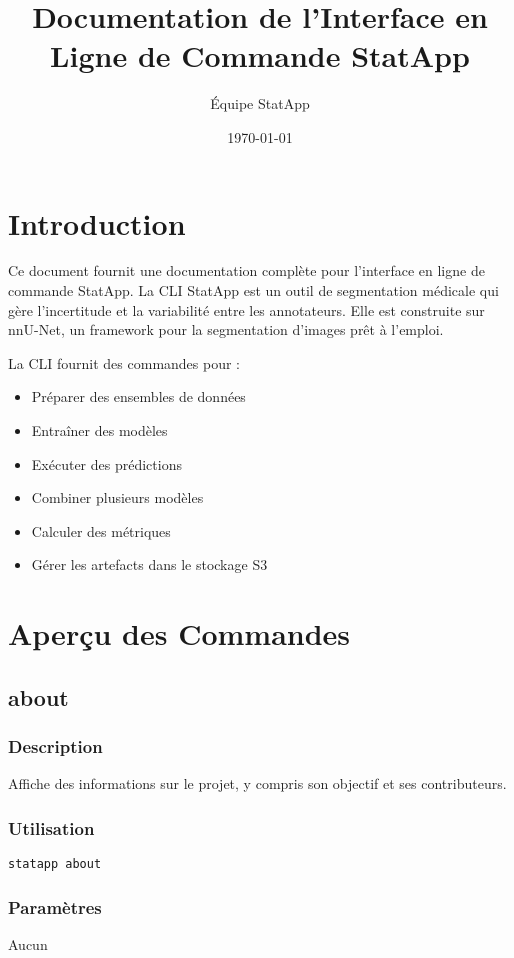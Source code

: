\documentclass{article}
\title{Documentation de l'Interface en Ligne de Commande StatApp}
\author{Équipe StatApp}
\date{\today}
\begin{document}
\maketitle
\tableofcontents
\newpage

\section{Introduction}
Ce document fournit une documentation complète pour l'interface en ligne de commande StatApp. La CLI StatApp est un outil de segmentation médicale qui gère l'incertitude et la variabilité entre les annotateurs. Elle est construite sur nnU-Net, un framework pour la segmentation d'images prêt à l'emploi.

La CLI fournit des commandes pour :
\begin{itemize}
    \item Préparer des ensembles de données
    \item Entraîner des modèles
    \item Exécuter des prédictions
    \item Combiner plusieurs modèles
    \item Calculer des métriques
    \item Gérer les artefacts dans le stockage S3
\end{itemize}

\section{Aperçu des Commandes}

\subsection{about}
\subsubsection{Description}
Affiche des informations sur le projet, y compris son objectif et ses contributeurs.

\subsubsection{Utilisation}
\begin{lstlisting}
statapp about
\end{lstlisting}

\subsubsection{Paramètres}
Aucun
\end{document}
